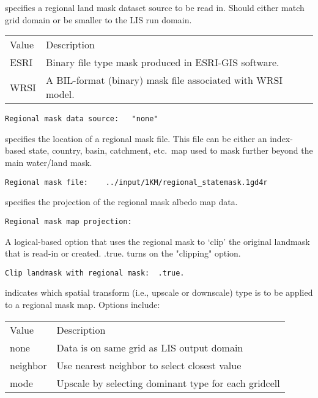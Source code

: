  
  specifies a regional land mask
 dataset source to be read in.  Should either match grid domain
 or be smaller to the LIS run domain.
  
 \begin{tabular}{ll}
 Value     & Description                  \\
 ESRI      & Binary file type mask produced in ESRI-GIS software. \\
 WRSI      & A BIL-format (binary) mask file associated with WRSI model. \\
 \end{tabular}
 

 \begin{Verbatim}[frame=single]
Regional mask data source:   "none"
 \end{Verbatim}

 
  specifies the location of a regional
 mask file.
 This file can be either an index-based state, country, basin,
 catchment, etc.\ map used to mask further beyond the main
 water/land mask.
 

 \begin{Verbatim}[frame=single]
Regional mask file:    ../input/1KM/regional_statemask.1gd4r
 \end{Verbatim}

 
  specifies the projection of the
 regional mask albedo map data.
 

 \begin{Verbatim}[frame=single]
Regional mask map projection:
 \end{Verbatim}

 
  A logical-based option 
  that uses the regional mask to `clip' the original landmask that is
  read-in or created.
  .true. turns on the "clipping" option.
 

 \begin{Verbatim}[frame=single]
Clip landmask with regional mask:  .true.
 \end{Verbatim}

 
  indicates which spatial
 transform (i.e., upscale or downscale) type is to be applied
 to a regional mask map.  Options include:

 \begin{tabular}{ll}
 Value     & Description                                          \\
 none      &  Data is on same grid as LIS output domain           \\
 neighbor  &  Use nearest neighbor to select closest value        \\
 mode      &  Upscale by selecting dominant type for each gridcell \\
 \end{tabular}
 

